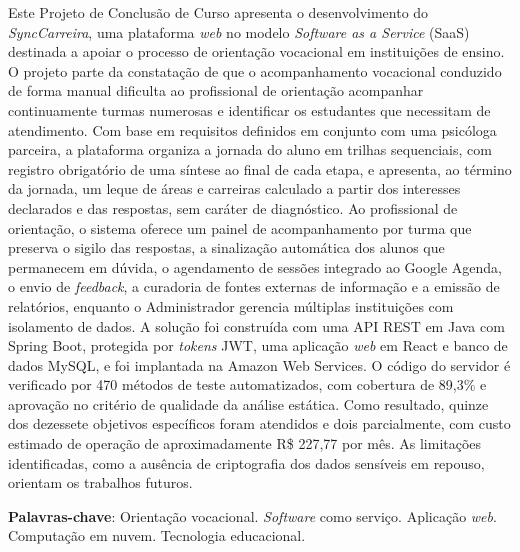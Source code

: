 \begin{resumo}
Este Projeto de Conclusão de Curso apresenta o desenvolvimento do \textit{SyncCarreira}, uma plataforma \textit{web} no modelo \textit{Software as a Service} (SaaS) destinada a apoiar o processo de orientação vocacional em instituições de ensino. O projeto parte da constatação de que o acompanhamento vocacional conduzido de forma manual dificulta ao profissional de orientação acompanhar continuamente turmas numerosas e identificar os estudantes que necessitam de atendimento. Com base em requisitos definidos em conjunto com uma psicóloga parceira, a plataforma organiza a jornada do aluno em trilhas sequenciais, com registro obrigatório de uma síntese ao final de cada etapa, e apresenta, ao término da jornada, um leque de áreas e carreiras calculado a partir dos interesses declarados e das respostas, sem caráter de diagnóstico. Ao profissional de orientação, o sistema oferece um painel de acompanhamento por turma que preserva o sigilo das respostas, a sinalização automática dos alunos que permanecem em dúvida, o agendamento de sessões integrado ao Google Agenda, o envio de \textit{feedback}, a curadoria de fontes externas de informação e a emissão de relatórios, enquanto o Administrador gerencia múltiplas instituições com isolamento de dados. A solução foi construída com uma API REST em Java com Spring Boot, protegida por \textit{tokens} JWT, uma aplicação \textit{web} em React e banco de dados MySQL, e foi implantada na Amazon Web Services. O código do servidor é verificado por 470 métodos de teste automatizados, com cobertura de 89,3\% e aprovação no critério de qualidade da análise estática. Como resultado, quinze dos dezessete objetivos específicos foram atendidos e dois parcialmente, com custo estimado de operação de aproximadamente R\$ 227,77 por mês. As limitações identificadas, como a ausência de criptografia dos dados sensíveis em repouso, orientam os trabalhos futuros.

\vspace{\onelineskip}

\noindent
\textbf{Palavras-chave}: Orientação vocacional. \textit{Software} como serviço. Aplicação \textit{web}. Computação em nuvem. Tecnologia educacional.
\end{resumo}
